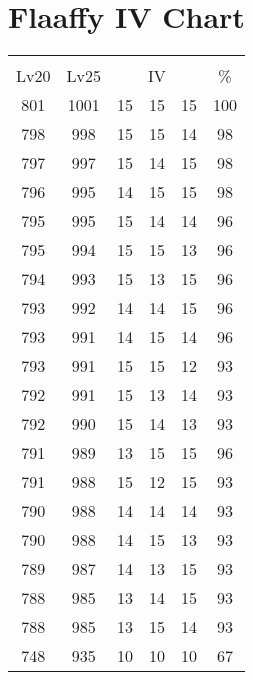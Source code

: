 \documentclass{article}%
\begin{document}
%
\normalsize%
\section{Flaaffy IV Chart}%
\label{sec:Flaaffy IV Chart}%
\renewcommand{\arraystretch}{1.5}%
\begin{tabular}{|c|c|c|c|c|c|}%
\hline%
\multicolumn{6}{|c|}{\textcolor{white}{ 
\linebreak{Flaaffy}
}%
\cellcolor{black}}\\%
\multicolumn{1}{|c}{Lv20}&\multicolumn{1}{c|}{Lv25}&\multicolumn{3}{c|}{IV}&\multicolumn{1}{|c|}{\%}\\%
\hline%
\rowcolor{color100}%
801&1001&15&15&15&100\\%
\hline%
\rowcolor{color98}%
798&998&15&15&14&98\\%
\hline%
\rowcolor{color98}%
797&997&15&14&15&98\\%
\hline%
\rowcolor{color98}%
796&995&14&15&15&98\\%
\hline%
\rowcolor{color96}%
795&995&15&14&14&96\\%
\hline%
\rowcolor{color96}%
795&994&15&15&13&96\\%
\hline%
\rowcolor{color96}%
794&993&15&13&15&96\\%
\hline%
\rowcolor{color96}%
793&992&14&14&15&96\\%
\hline%
\rowcolor{color96}%
793&991&14&15&14&96\\%
\hline%
\rowcolor{color93}%
793&991&15&15&12&93\\%
\hline%
\rowcolor{color93}%
792&991&15&13&14&93\\%
\hline%
\rowcolor{color93}%
792&990&15&14&13&93\\%
\hline%
\rowcolor{color96}%
791&989&13&15&15&96\\%
\hline%
\rowcolor{color93}%
791&988&15&12&15&93\\%
\hline%
\rowcolor{color93}%
790&988&14&14&14&93\\%
\hline%
\rowcolor{color93}%
790&988&14&15&13&93\\%
\hline%
\rowcolor{color93}%
789&987&14&13&15&93\\%
\hline%
\rowcolor{color93}%
788&985&13&14&15&93\\%
\hline%
\rowcolor{color93}%
788&985&13&15&14&93\\%
\hline%
\rowcolor{color91}%
748&935&10&10&10&67\\%
\end{tabular}

%
\end{document}
